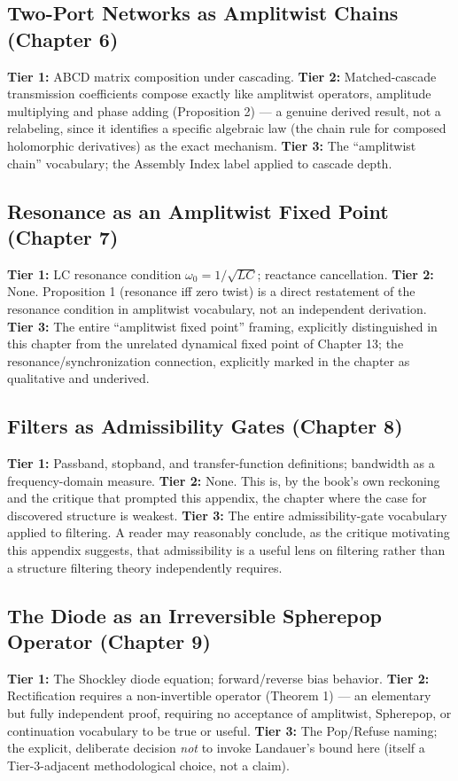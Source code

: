 \documentclass[12pt]{article}
\begin{document}
\subsection*{Two-Port Networks as Amplitwist Chains (Chapter 6)}
\textbf{Tier 1:} ABCD matrix composition under cascading.
\textbf{Tier 2:} Matched-cascade transmission coefficients compose exactly like amplitwist operators, amplitude multiplying and phase adding (Proposition 2) --- a genuine derived result, not a relabeling, since it identifies a specific algebraic law (the chain rule for composed holomorphic derivatives) as the exact mechanism.
\textbf{Tier 3:} The ``amplitwist chain'' vocabulary; the Assembly Index label applied to cascade depth.

\subsection*{Resonance as an Amplitwist Fixed Point (Chapter 7)}
\textbf{Tier 1:} LC resonance condition $\omega_0 = 1/\sqrt{LC}$; reactance cancellation.
\textbf{Tier 2:} None. Proposition 1 (resonance iff zero twist) is a direct restatement of the resonance condition in amplitwist vocabulary, not an independent derivation.
\textbf{Tier 3:} The entire ``amplitwist fixed point'' framing, explicitly distinguished in this chapter from the unrelated dynamical fixed point of Chapter 13; the resonance/synchronization connection, explicitly marked in the chapter as qualitative and underived.

\subsection*{Filters as Admissibility Gates (Chapter 8)}
\textbf{Tier 1:} Passband, stopband, and transfer-function definitions; bandwidth as a frequency-domain measure.
\textbf{Tier 2:} None. This is, by the book's own reckoning and the critique that prompted this appendix, the chapter where the case for discovered structure is weakest.
\textbf{Tier 3:} The entire admissibility-gate vocabulary applied to filtering. A reader may reasonably conclude, as the critique motivating this appendix suggests, that admissibility is a useful lens on filtering rather than a structure filtering theory independently requires.

\subsection*{The Diode as an Irreversible Spherepop Operator (Chapter 9)}
\textbf{Tier 1:} The Shockley diode equation; forward/reverse bias behavior.
\textbf{Tier 2:} Rectification requires a non-invertible operator (Theorem 1) --- an elementary but fully independent proof, requiring no acceptance of amplitwist, Spherepop, or continuation vocabulary to be true or useful.
\textbf{Tier 3:} The Pop/Refuse naming; the explicit, deliberate decision \emph{not} to invoke Landauer's bound here (itself a Tier-3-adjacent methodological choice, not a claim).
\end{document}
